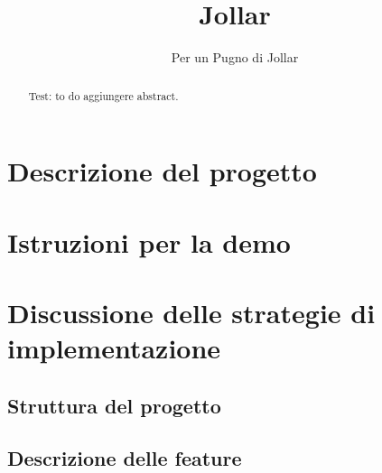 \documentclass[12pt,a4paper]{article}
\title{Jollar}
\author{Per un Pugno di Jollar}
\begin{document}
\maketitle
\begin{abstract}
\noindent Test: to do aggiungere abstract.
\end{abstract}
\tableofcontents
\newpage
\section{Descrizione del progetto}
\newpage
\section{Istruzioni per la demo}
\newpage
\section{Discussione delle strategie di implementazione}
\subsection{Struttura del progetto}
\subsection{Descrizione delle feature}
\end{document}

